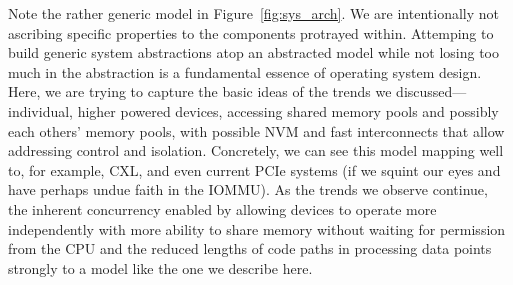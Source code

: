 Note the rather generic model in Figure~\ref{fig:sys_arch}. We are intentionally not ascribing specific properties to
the components protrayed within. Attemping to build generic system abstractions atop an abstracted model while not
losing too much in the abstraction is a fundamental essence of operating system design. Here, we are trying to capture
the basic ideas of the trends we discussed---individual, higher powered devices, accessing shared memory pools and
possibly each others' memory pools, with possible NVM and fast interconnects that allow addressing control and
isolation. Concretely, we can see this model mapping well to, for example, CXL, and even current PCIe systems (if we squint
our eyes
and have perhaps undue faith in the IOMMU). As the trends we observe continue, the inherent concurrency enabled by
allowing devices to operate more independently with more ability to share memory without waiting for permission from the
CPU and the reduced lengths of code paths in processing data points strongly to a model like the one we describe here.

